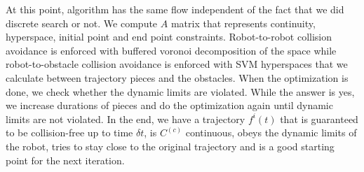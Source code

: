 \documentclass{svproc}
\begin{document}
At this point, algorithm has the same flow independent of the fact that we did discrete search or not. We compute $A$ matrix that represents continuity, hyperspace, initial point and end point constraints. Robot-to-robot collision avoidance is enforced with buffered voronoi decomposition of the space while robot-to-obstacle collision avoidance is enforced with SVM hyperspaces that we calculate between trajectory pieces and the obstacles. When the optimization is done, we check whether the dynamic limits are violated. While the answer is yes, we increase durations of pieces and do the optimization again until dynamic limits are not violated. In the end, we have a trajectory $f^i(t)$ that is guaranteed to be collision-free up to time $\delta t$, is $C^{(c)}$ continuous, obeys the dynamic limits of the robot, tries to stay close to the original trajectory and is a good starting point for the next iteration.
\end{document}
